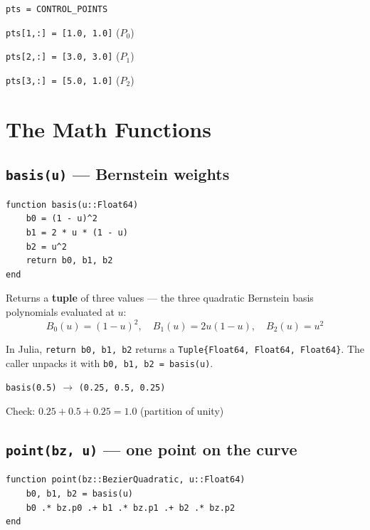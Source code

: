 \documentclass[12pt, a4paper]{article}
\newcommand{\cd}[1]{\texttt{#1}}
\begin{document}
\begin{examplebox}
\cd{pts = CONTROL\_POINTS}

\cd{pts[1,:] = [1.0, 1.0]} \quad ($P_0$)

\cd{pts[2,:] = [3.0, 3.0]} \quad ($P_1$)

\cd{pts[3,:] = [5.0, 1.0]} \quad ($P_2$)
\end{examplebox}


\section{The Math Functions}

\subsection{\texttt{basis(u)} --- Bernstein weights}

\begin{verbatim}
function basis(u::Float64)
    b0 = (1 - u)^2
    b1 = 2 * u * (1 - u)
    b2 = u^2
    return b0, b1, b2
end
\end{verbatim}

Returns a \textbf{tuple} of three values --- the three
quadratic Bernstein basis polynomials evaluated at $u$:
\[
  B_0(u) = (1-u)^2, \quad
  B_1(u) = 2u(1-u), \quad
  B_2(u) = u^2
\]

In Julia, \cd{return b0, b1, b2} returns a \cd{Tuple\{Float64, Float64, Float64\}}.
The caller unpacks it with \cd{b0, b1, b2 = basis(u)}.

\begin{examplebox}
\cd{basis(0.5)} $\to$ \cd{(0.25, 0.5, 0.25)}

Check: $0.25 + 0.5 + 0.25 = 1.0$ \checkmark
(partition of unity)
\end{examplebox}

\subsection{\texttt{point(bz, u)} --- one point on the curve}

\begin{verbatim}
function point(bz::BezierQuadratic, u::Float64)
    b0, b1, b2 = basis(u)
    b0 .* bz.p0 .+ b1 .* bz.p1 .+ b2 .* bz.p2
end
\end{verbatim}
\end{document}
